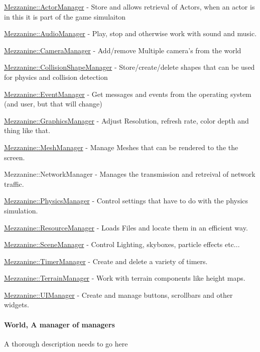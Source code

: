 \begin{DoxyItemize}
\item \hyperlink{classMezzanine_1_1ActorManager}{Mezzanine::ActorManager} -\/ Store and allows retrieval of Actors, when an actor is in this it is part of the game simulaiton
\item \hyperlink{classMezzanine_1_1AudioManager}{Mezzanine::AudioManager} -\/ Play, stop and otherwise work with sound and music.
\item \hyperlink{classMezzanine_1_1CameraManager}{Mezzanine::CameraManager} -\/ Add/remove Multiple camera's from the world
\item \hyperlink{classMezzanine_1_1CollisionShapeManager}{Mezzanine::CollisionShapeManager} -\/ Store/create/delete shapes that can be used for physics and collision detection
\item \hyperlink{classMezzanine_1_1EventManager}{Mezzanine::EventManager} -\/ Get messages and events from the operating system (and user, but that will change)
\item \hyperlink{classMezzanine_1_1GraphicsManager}{Mezzanine::GraphicsManager} -\/ Adjust Resolution, refresh rate, color depth and thing like that.
\item \hyperlink{classMezzanine_1_1MeshManager}{Mezzanine::MeshManager} -\/ Manage Meshes that can be rendered to the the screen.
\item Mezzanine::NetworkManager -\/ Manages the transmission and retreival of network traffic.
\item \hyperlink{classMezzanine_1_1PhysicsManager}{Mezzanine::PhysicsManager} -\/ Control settings that have to do with the physics simulation.
\item \hyperlink{classMezzanine_1_1ResourceManager}{Mezzanine::ResourceManager} -\/ Loads Files and locate them in an efficient way.
\item \hyperlink{classMezzanine_1_1SceneManager}{Mezzanine::SceneManager} -\/ Control Lighting, skyboxes, particle effects etc...
\item \hyperlink{classMezzanine_1_1TimerManager}{Mezzanine::TimerManager} -\/ Create and delete a variety of timers.
\item \hyperlink{classMezzanine_1_1TerrainManager}{Mezzanine::TerrainManager} -\/ Work with terrain components like height maps.
\item \hyperlink{classMezzanine_1_1UIManager}{Mezzanine::UIManager} -\/ Create and manage buttons, scrollbars and other widgets.
\end{DoxyItemize}\hypertarget{index_The}{}\paragraph{World, A manager of managers}\label{index_The}
A thorough description needs to go here

